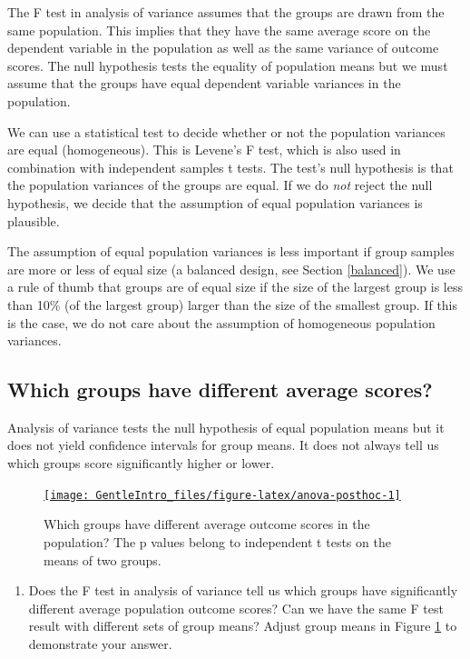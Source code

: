 \documentclass[a4paper]{book}
\providecommand{\tightlist}{%
  \setlength{\itemsep}{0pt}\setlength{\parskip}{0pt}}
\theoremstyle{definition}
\theoremstyle{definition}
\theoremstyle{definition}
\theoremstyle{remark}
\begin{document}
The F test in analysis of variance assumes that the groups are drawn
from the same population. This implies that they have the same average
score on the dependent variable in the population as well as the same
variance of outcome scores. The null hypothesis tests the equality of
population means but we must assume that the groups have equal dependent
variable variances in the population.

We can use a statistical test to decide whether or not the population
variances are equal (homogeneous). This is Levene's F test, which is
also used in combination with independent samples t tests. The test's
null hypothesis is that the population variances of the groups are
equal. If we do \emph{not} reject the null hypothesis, we decide that
the assumption of equal population variances is plausible.

The assumption of equal population variances is less important if group
samples are more or less of equal size (a balanced design, see Section
\ref{balanced}). We use a rule of thumb that groups are of equal size if
the size of the largest group is less than 10\% (of the largest group)
larger than the size of the smallest group. If this is the case, we do
not care about the assumption of homogeneous population variances.

\subsection{Which groups have different average
scores?}\label{which-groups-have-different-average-scores}

Analysis of variance tests the null hypothesis of equal population means
but it does not yield confidence intervals for group means. It does not
always tell us which groups score significantly higher or lower.

\begin{figure}[H]
\href{http://82.196.4.233:3838/apps/anova-posthoc/}{\texttt{[image: GentleIntro\_files/figure-latex/anova-posthoc-1]} }\caption{Which groups have different average outcome scores in the population? The p values belong to independent t tests on the means of two groups.}\label{fig:anova-posthoc}
\end{figure}

\begin{enumerate}
\def\labelenumi{\arabic{enumi}.}
\tightlist
\item
  Does the F test in analysis of variance tell us which groups have
  significantly different average population outcome scores? Can we have
  the same F test result with different sets of group means? Adjust
  group means in Figure \ref{fig:anova-posthoc} to demonstrate your
  answer.
\end{enumerate}
\end{document}
